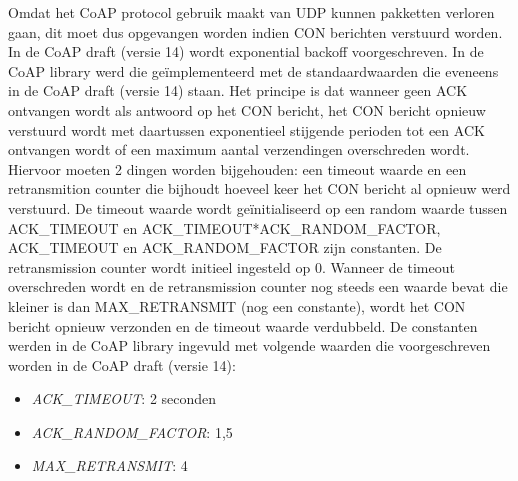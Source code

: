 Omdat het CoAP protocol gebruik maakt van UDP kunnen pakketten verloren gaan, dit moet dus opgevangen worden indien CON berichten verstuurd worden. In de CoAP draft (versie 14) wordt exponential backoff voorgeschreven. In de CoAP library werd die geïmplementeerd met de standaardwaarden die eveneens in de CoAP draft (versie 14) staan. Het principe is dat wanneer geen ACK ontvangen wordt als antwoord op het CON bericht, het CON bericht opnieuw verstuurd wordt met daartussen exponentieel stijgende perioden tot een ACK ontvangen wordt of een maximum aantal verzendingen overschreden wordt. Hiervoor moeten 2 dingen worden bijgehouden: een timeout waarde en een retransmition counter die bijhoudt hoeveel keer het CON bericht al opnieuw werd verstuurd. De timeout waarde wordt ge\"{i}nitialiseerd op een random waarde tussen ACK\_TIMEOUT en ACK\_TIMEOUT*ACK\_RANDOM\_FACTOR, ACK\_TIMEOUT en ACK\_RANDOM\_FACTOR zijn constanten. De retransmission counter wordt initieel ingesteld op 0. Wanneer de timeout overschreden wordt en de retransmission counter nog steeds een waarde bevat die kleiner is dan MAX\_RETRANSMIT (nog een constante), wordt het CON bericht opnieuw verzonden en de timeout waarde verdubbeld. De constanten werden in de CoAP library ingevuld met volgende waarden die voorgeschreven worden in de CoAP draft (versie 14):
\begin{itemize}
\item \textit{ACK\_TIMEOUT}: 2 seconden
\item \textit{ACK\_RANDOM\_FACTOR}: 1,5
\item \textit{MAX\_RETRANSMIT}: 4
\end{itemize}







